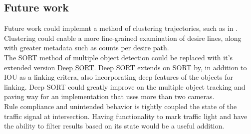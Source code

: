 \subsection{Future work}
Future work could implemnt a method of clustering trajectories,
such as in \cite{gariel_trajectory_2011}. Clustering could enable a more fine-grained examination of desire lines,
along with greater metadata such as counts per desire path.
\ \\

The SORT method of multiple object detection could be replaced with it's extended version \href{https://github.com/nwojke/deep_sort}{Deep SORT}.
Deep SORT extends on SORT by, in addition to IOU as a linking critera, also incorporating
deep features of the objects for linking. Deep SORT could greatly improve on the multiple object tracking
and paving way for an implementation that uses more than two cameras.
\ \\

Rule compliance and unintended behavior is tightly coupled the state of the traffic signal at intersection. 
Having functionality to mark traffic light and have the ability to filter results based on its state would
be a useful addition. 